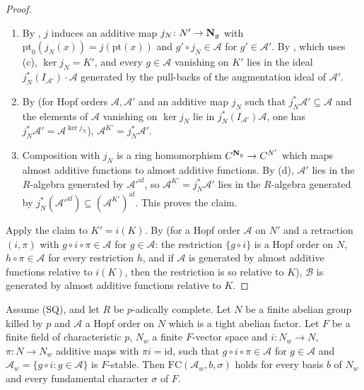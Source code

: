 \begin{proof}
\begin{enumerate}[label=(\alph*)]
  under such $e$.)
\item By , $j$ induces an additive map
  $j_N\colon N'\to\mathbf N_g$ with $\mathrm{pt}_0(j_N(x))=j(\mathrm{pt}(x))$ and $g'\circ j_N\in\mathcal A$ for
  $g'\in\mathcal A'$. By , which uses (c), $\ker j_N=K'$,
  and every $g\in\mathcal A$ vanishing on $K'$ lies in the ideal $j_N^*(I_{\mathcal A'})\cdot\mathcal A$ generated by the
  pull-backs of the augmentation ideal of $\mathcal A'$.
\item By  (for Hopf orders $\mathcal A,\mathcal A'$ and an additive
  map $j_N$ such that $j_N^*\mathcal A'\subseteq\mathcal A$ and the elements of $\mathcal A$ vanishing on $\ker j_N$ lie in
  $j_N^*(I_{\mathcal A'})\mathcal A$, one has $j_N^*\mathcal A'=\mathcal A^{\ker j_N}$), $\mathcal A^{K'}=j_N^*\mathcal A'$.
\item Composition with $j_N$ is a ring homomorphism $C^{\mathbf N_g}\to C^{N'}$ which maps almost additive functions to almost
  additive functions. By (d), $\mathcal A'$ lies in the $R$-algebra generated by $\mathcal A'^{\mathrm{af}}$, so
  $\mathcal A^{K'}=j_N^*\mathcal A'$ lies in the $R$-algebra generated by $j_N^*(\mathcal A'^{\mathrm{af}})\subseteq
  (\mathcal A^{K'})^{\mathrm{af}}$. This proves the claim.
\end{enumerate}
Apply the claim to $K'=i(K)$. By  (for a Hopf order $\mathcal A$ on
$N'$ and a retraction $(i,\pi)$ with $g\circ i\circ\pi\in\mathcal A$ for $g\in\mathcal A$: the restriction
$\{g\circ i\}$ is a Hopf order on $N$, $h\circ\pi\in\mathcal A$ for every restriction $h$, and if $\mathcal A$ is generated by
almost additive functions relative to $i(K)$, then the restriction is so relative to $K$), $\mathcal B$ is generated by almost
additive functions relative to $K$.
\end{proof}

\begin{theorem}\label{pf:tower:abfactor}
Assume \textup{(SQ)}, and let $R$ be $p$-adically complete. Let $N$ be a finite abelian group killed by $p$ and
$\mathcal A$ a Hopf order on $N$ which is a tight abelian factor. Let $F$ be a finite field of characteristic $p$, $N_w$ a
finite $F$-vector space and $i\colon N_w\to N$, $\pi\colon N\to N_w$ additive maps with $\pi i=\mathrm{id}$, such that
$g\circ i\circ\pi\in\mathcal A$ for $g\in\mathcal A$ and $\mathcal A_w=\{g\circ i:g\in\mathcal A\}$ is $F$-stable. Then
$\mathrm{FC}(\mathcal A_w,b,\sigma)$ holds for every basis $b$ of $N_w$ and every fundamental character $\sigma$ of $F$.
\end{theorem}

